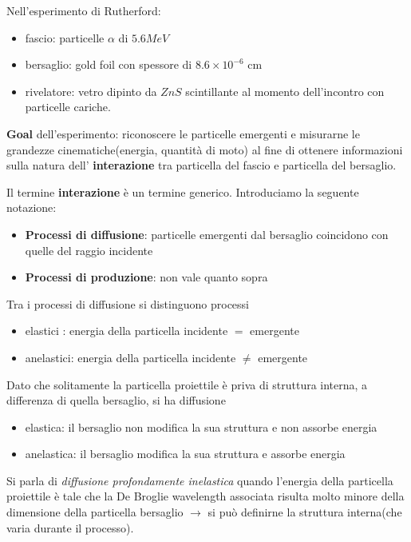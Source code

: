 \documentclass[]{tufte-book}
\providecommand{\tightlist}{%
  \setlength{\itemsep}{0pt}\setlength{\parskip}{0pt}}
\theoremstyle{definition}
\theoremstyle{theorem}
\theoremstyle{plain}
\theoremstyle{remark}
\theoremstyle{remark}
\begin{document}
Nell'esperimento di Rutherford:

\begin{itemize}
\tightlist
\item
  fascio: particelle \(\alpha\) di \(5.6 MeV\)
\item
  bersaglio: gold foil con spessore di \(8.6 \times 10^{-6}\) cm
\item
  rivelatore: vetro dipinto da \(ZnS\) scintillante al momento
  dell'incontro con particelle cariche.
\end{itemize}

\textbf{Goal} dell'esperimento: riconoscere le particelle emergenti e
misurarne le grandezze cinematiche(energia, quantità di moto) al fine di
ottenere informazioni sulla natura dell' \textbf{interazione} tra
particella del fascio e particella del bersaglio.

Il termine \textbf{interazione} è un termine generico. Introduciamo la
seguente notazione:

\begin{itemize}
\tightlist
\item
  \textbf{Processi di diffusione}: particelle emergenti dal bersaglio
  coincidono con quelle del raggio incidente
\item
  \textbf{Processi di produzione}: non vale quanto sopra
\end{itemize}

Tra i processi di diffusione si distinguono processi

\begin{itemize}
\tightlist
\item
  elastici : energia della particella incidente \(=\) emergente
\item
  anelastici: energia della particella incidente \(\neq\) emergente
\end{itemize}

Dato che solitamente la particella proiettile è priva di struttura
interna, a differenza di quella bersaglio, si ha diffusione

\begin{itemize}
\item
  elastica: il bersaglio non modifica la sua struttura e non assorbe
  energia
\item
  anelastica: il bersaglio modifica la sua struttura e assorbe energia
\end{itemize}

Si parla di \emph{diffusione profondamente inelastica} quando l'energia
della particella proiettile è tale che la De Broglie wavelength
associata risulta molto minore della dimensione della particella
bersaglio \(\rightarrow\) si può definirne la struttura interna(che
varia durante il processo).
\end{document}
